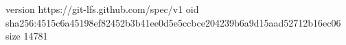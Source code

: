 version https://git-lfs.github.com/spec/v1
oid sha256:4515c6a45198ef82452b3b41ee0d5e5ccbce204239b6a9d15aad52712b16ec06
size 14781
